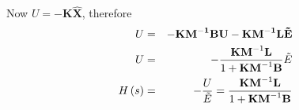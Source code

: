 Now $U=-\mathbf{K}\hat{\mathbf{X}}$, therefore
\begin{eqnarray*}
	U & = &  - \bf{KM}^{ - 1} {\bf{B}}U - {\bf{KM}}^{ - 1} {\bf{L}}\tilde E \\
	U & = &  - \frac{{{\bf{KM}}^{ - 1} {\bf{L}}}}{{1 + {\bf{KM}}^{ - 1} {\bf{B}}}}\tilde E \\
	H\left( s \right) & = &  - \frac{U}{{\tilde E}} = \frac{{{\bf{KM}}^{ - 1} {\bf{L}}}}{{1 + {\bf{KM}}^{ - 1} {\bf{B}}}}
\end{eqnarray*}


\endinput

